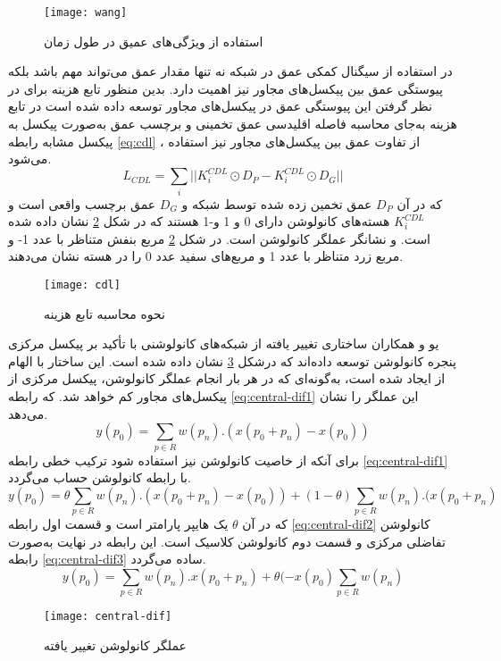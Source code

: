 \begin{figure}[h]
	\centerline{\texttt{[image: wang]}}
	\caption{استفاده از ویژگی‌های عمیق در طول زمان \cite{wang2018exploiting}}
	\label{fig:wang}
\end{figure}
در استفاده از سیگنال کمکی عمق در شبکه نه تنها مقدار عمق می‌تواند مهم باشد بلکه پیوستگی عمق بین پیکسل‌های مجاور نیز اهمیت دارد. بدین منظور تابع هزینه  برای در نظر گرفتن این پیوستگی عمق در پیکسل‌های مجاور توسعه داده شده است
\cite{wang2020deep,wang2018exploiting}
در تابع هزینه  به‌جای محاسبه فاصله اقلیدسی عمق تخمینی و برچسب عمق به‌صورت پیکسل به پیکسل مشابه رابطه
\ref{eq:cdl}
، از تفاوت عمق بین پیکسل‌های مجاور نیز استفاده می‌شود.
\begin{equation}\label{eq:cdl}
	L_{CDL} = \sum_{i}||K_i^{CDL} \odot D_P-K_i^{CDL} \odot D_G||
\end{equation}
که در آن
$D_P$
عمق تخمین زده شده توسط شبکه و
$D_G$
عمق برچسب واقعی است و
$K_i^{CDL}$
هسته‌های کانولوشن دارای 0 و 1 و-1 هستند که در شکل
\ref{fig:cdl}
نشان داده شده است. و  نشانگر عملگر کانولوشن است. در شکل
\ref{fig:cdl}
مربع بنفش متناظر با عدد 1- و مربع زرد متناظر با عدد 1 و مربع‌های سفید عدد 0 را در هسته نشان می‌دهند. 
 \begin{figure}[h]
 	\centerline{\texttt{[image: cdl]}}
 	\caption{نحوه محاسبه تابع هزینه  \cite{yu2020searching}}
 	\label{fig:cdl}
 \end{figure}
یو و همکاران
\cite{yu2020searching}
ساختاری تغییر یافته از شبکه‌های کانولوشنی با تأکید بر پیکسل مرکزی پنجره کانولوشن توسعه داده‌اند که درشکل
\ref{fig:central-dif}
نشان داده شده است.
این ساختار با الهام از  ایجاد شده است، به‌گونه‌ای که در هر بار انجام عملگر کانولوشن، پیکسل مرکزی از پیکسل‌های مجاور کم خواهد شد. که رابطه
\ref{eq:central-dif1}
این عملگر را نشان می‌دهد.
\begin{equation}\label{eq:central-dif1}
	y(p_0) = \sum_{p \in R} w(p_n).(x(p_0+p_n)-x(p_0)) 
\end{equation}
برای آنکه از خاصیت کانولوشن نیز استفاده شود ترکیب خطی رابطه
\ref{eq:central-dif1}
با رابطه کانولوشن حساب می‌گردد.
\begin{equation}\label{eq:central-dif2}
	y(p_0) = \theta\sum_{p \in R} w(p_n).(x(p_0+p_n)-x(p_0)) +
	(1-\theta)\sum_{p \in R}w(p_n).(x(p_0+p_n)
\end{equation}
که در آن
$\theta$
یک هایپر پارامتر است و قسمت اول رابطه
\ref{eq:central-dif2}
کانولوشن تفاضلی مرکزی و قسمت دوم کانولوشن کلاسیک است. این رابطه در نهایت به‌صورت رابطه
\ref{eq:central-dif3}
ساده می‌گردد.
\begin{equation}\label{eq:central-dif3}
	y(p_0) = \sum_{p \in R} {w(p_n).x(p_0+p_n)} +
	\theta(-x(p_0)\sum_{p \in R}{w(p_n)}
\end{equation}
\begin{figure}[h]
	\centerline{\texttt{[image: central-dif]}}
	\caption{عملگر کانولوشن تغییر یافته \cite{yu2020searching} }
	\label{fig:central-dif}
\end{figure}

